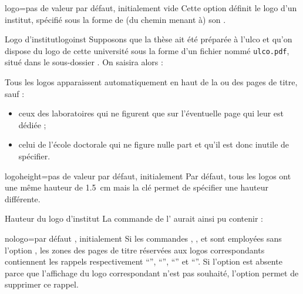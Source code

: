 \begin{docKey}{logo}{=}{pas de valeur
    par défaut, initialement vide}
  Cette option définit le logo d'un institut, spécifié sous la forme de (du
  chemin menant à) son .
  \begin{dbexample}{Logo d'institut}{logoinst}
    Supposons que la thèse ait été préparée à l'\gls{ulco} et qu'on dispose du
    logo de cette université sous la forme d'un fichier nommé
    \texttt{ulco.pdf}, situé dans le sous-dossier . On
    saisira alors :
\begin{preamblecode}[listing options={deletekeywords={[5]institute}}]
\end{preamblecode}
\end{dbexample}
Tous les logos apparaissent automatiquement en haut de la ou des
pages de titre, sauf :
\begin{itemize}
\item ceux des laboratoires qui ne figurent que sur l'éventuelle page qui leur
  est dédiée ;
\item celui de l'école doctorale qui ne figure nulle part et qu'il est donc
  inutile de spécifier.
\end{itemize}
\end{docKey}
%
\begin{docKey}{logoheight}{=}{pas de valeur par
    défaut, initialement \docValue*{1.5cm}}
  Par défaut, tous les logos ont une même hauteur de \qty{1.5}{\cm}
  mais la clé  permet de spécifier une hauteur
  différente.
  \begin{dbexample}{Hauteur du logo d'institut}{}
    La commande de l' aurait ainsi pu contenir :
\begin{preamblecode}[listing options={deletekeywords={[5]institute}}]
\end{preamblecode}
\end{dbexample}
\end{docKey}
%
\begin{docKey}[][doc new=2019-03-28]{nologo}{=\textbar{}}{par défaut
    , initialement }%
  Si les commandes , ,  et
   sont employées sans l'option , les zones des
  pages de titre réservées aux logos correspondants contiennent les rappels
  respectivement \enquote{}, \enquote{}, \enquote{} et
  \enquote{}. Si l'option  est absente
  parce que l'affichage du logo correspondant n'est pas souhaité, l'option
   permet de supprimer ce rappel.
\end{docKey}
